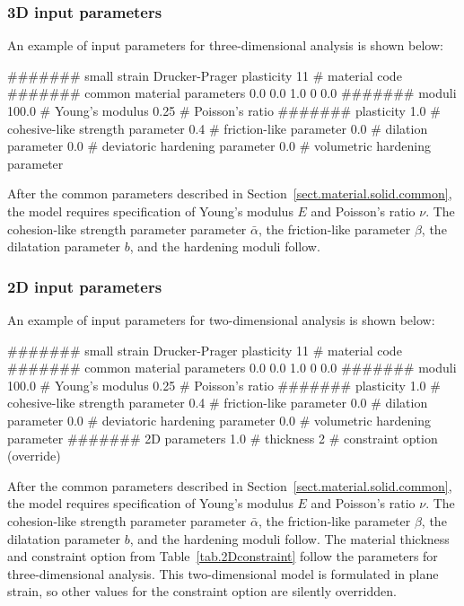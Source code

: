 \subsubsection{3D input parameters}
An example of input parameters for three-dimensional analysis is shown 
below:
\begin{inputfile}
####### small strain Drucker-Prager plasticity
11    # material code
####### common material parameters
0.0    0.0    1.0
0      0.0
####### moduli
100.0 # Young's modulus
0.25  # Poisson's ratio
####### plasticity
1.0   # cohesive-like strength parameter
0.4   # friction-like parameter
0.0	  # dilation parameter
0.0	  # deviatoric hardening parameter
0.0	  # volumetric hardening parameter
\end{inputfile}
After the common parameters described in 
Section~\ref{sect.material.solid.common}, the 
model requires specification of Young's modulus 
$E$ and Poisson's ratio $\nu$.
The cohesion-like strength parameter 
parameter $\bar{\alpha}$, the friction-like
parameter $\beta$, the dilatation
parameter $b$, and the hardening moduli follow.

\subsubsection{2D input parameters}
An example of input parameters for two-dimensional analysis is shown 
below:
\begin{inputfile}
####### small strain Drucker-Prager plasticity
11    # material code
####### common material parameters
0.0    0.0    1.0
0      0.0
####### moduli
100.0 # Young's modulus
0.25  # Poisson's ratio
####### plasticity
1.0   # cohesive-like strength parameter
0.4   # friction-like parameter
0.0	  # dilation parameter
0.0	  # deviatoric hardening parameter
0.0	  # volumetric hardening parameter
####### 2D parameters
1.0   # thickness
2     # constraint option (override)
\end{inputfile}
After the common parameters described in 
Section~\ref{sect.material.solid.common}, the 
model requires specification of Young's modulus 
$E$ and Poisson's ratio $\nu$.
The cohesion-like strength parameter 
parameter $\bar{\alpha}$, the friction-like
parameter $\beta$, the dilatation
parameter $b$, and the hardening moduli follow.
The material thickness and 
constraint option from Table~\ref{tab.2Dconstraint} 
follow the parameters for three-dimensional analysis.
This two-dimensional model is formulated in plane strain,
so other values for the constraint option are silently
overridden.

